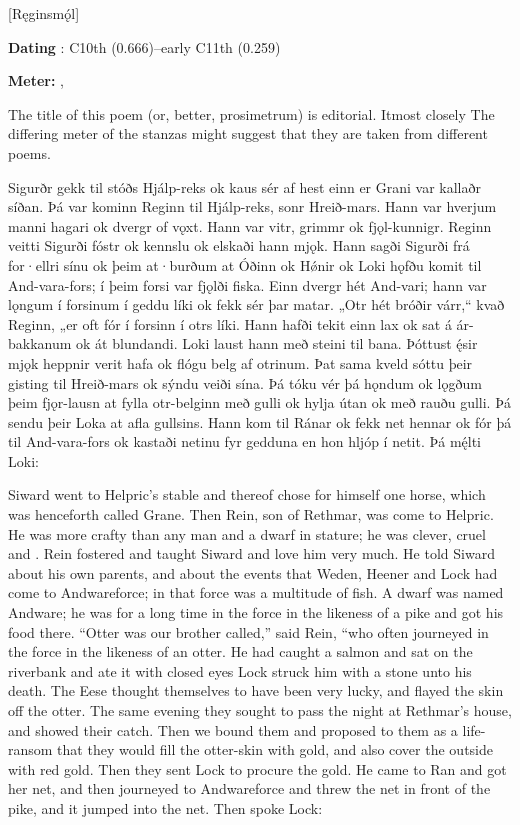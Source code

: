 [Ręginsmǫ́l]

\begin{flushright}%
\textbf{Dating} \parencite{Sapp2022}: C10th (0.666)–early C11th (0.259)

\textbf{Meter:} \Ljodahattr, \Fornyrdislag%
\end{flushright}

The title of this poem (or, better, prosimetrum) is editorial.  Itmost closely The differing meter of the stanzas might suggest that they are taken from different poems.

\sectionline

\bpg\bpa Sigurðr gekk til stóðs Hjálp-reks ok kaus sér af hest einn er Grani var kallaðr síðan. Þá var kominn Reginn til Hjálp-reks, sonr Hreið-mars. Hann var hverjum manni hagari ok dvergr of vǫxt. Hann var vitr, grimmr ok fjǫl-kunnigr. Reginn veitti Sigurði fóstr ok kennslu ok elskaði hann mjǫk. Hann sagði Sigurði frá for·ellri sínu ok þeim at·burðum at Óðinn ok Hǿnir ok Loki hǫfðu komit til And-vara-fors; í þeim forsi var fjǫlði fiska. Einn dvergr hét And-vari; hann var lǫngum í forsinum í geddu líki ok fekk sér þar matar. „Otr hét bróðir várr,“ kvað Reginn, „er oft fór í forsinn í otrs líki. Hann hafði tekit einn lax ok sat á ár-bakkanum ok át blundandi. Loki laust hann með steini til bana. Þóttust ę́sir mjǫk heppnir verit hafa ok flógu belg af otrinum. Þat sama kveld sóttu þeir gisting til Hreið-mars ok sýndu veiði sína. Þá tóku vér þá hǫndum ok lǫgðum þeim fjǫr-lausn at fylla otr-belginn með gulli ok hylja útan ok með rauðu gulli. Þá sendu þeir Loka at afla gullsins. Hann kom til Ránar ok fekk net hennar ok fór þá til And-vara-fors ok kastaði netinu fyr gedduna en hon hljóp í netit. Þá mę́lti Loki:\epa

\bpb Siward went to Helpric’s stable and thereof chose for himself one horse, which was henceforth called Grane. Then Rein, son of Rethmar, was come to Helpric. He was more crafty than any man and a dwarf in stature; he was clever, cruel and . Rein fostered and taught Siward and love him very much. He told Siward about his own parents, and about the events that Weden, Heener and Lock had come to Andwareforce; in that force was a multitude of fish. A dwarf was named Andware; he was for a long time in the force in the likeness of a pike and got his food there. “Otter was our brother called,” said Rein, “who often journeyed in the force in the likeness of an otter. He had caught a salmon and sat on the riverbank and ate it with closed eyes Lock struck him with a stone unto his death. The Eese thought themselves to have been very lucky, and flayed the skin off the otter. The same evening they sought to pass the night at Rethmar’s house, and showed their catch. Then we bound them and proposed to them as a life-ransom that they would fill the otter-skin with gold, and also cover the outside with red gold. Then they sent Lock to procure the gold. He came to Ran and got her net, and then journeyed to Andwareforce and threw the net in front of the pike, and it jumped into the net. Then spoke Lock:\epb\epg


